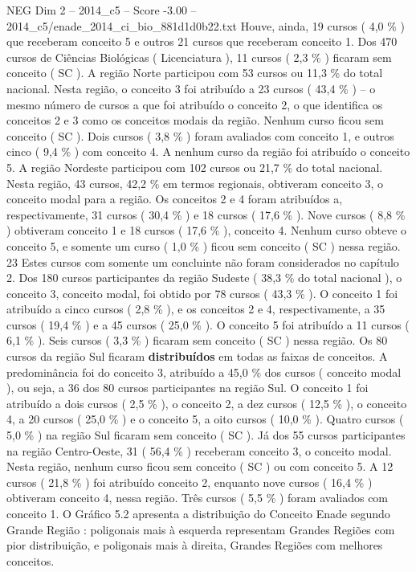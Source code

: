 \begin{textsample}{NEG Dim 2 – 2014\_c5 – Score -3.00 – 2014\_c5/enade\_2014\_ci\_bio\_881d1d0b22.txt}
Houve, ainda, 19 cursos ( 4,0 \% ) que receberam conceito 5 e outros 21 cursos que receberam conceito 1.
Dos 470 cursos de Ciências Biológicas ( Licenciatura ), 11 cursos ( 2,3 \% ) ficaram sem conceito ( SC ).
A região Norte participou com 53 cursos ou 11,3 \% do total nacional.
Nesta região, o conceito 3 foi atribuído a 23 cursos ( 43,4 \% ) – o mesmo número de cursos a que foi atribuído o conceito 2, o que identifica os conceitos 2 e 3 como os conceitos modais da região.
Nenhum curso ficou sem conceito ( SC ).
Dois cursos ( 3,8 \% ) foram avaliados com conceito 1, e outros cinco ( 9,4 \% ) com conceito 4.
A nenhum curso da região foi atribuído o conceito 5.
A região Nordeste participou com 102 cursos ou 21,7 \% do total nacional.
Nesta região, 43 cursos, 42,2 \% em termos regionais, obtiveram conceito 3, o conceito modal para a região.
Os conceitos 2 e 4 foram atribuídos a, respectivamente, 31 cursos ( 30,4 \% ) e 18 cursos ( 17,6 \% ).
Nove cursos ( 8,8 \% ) obtiveram conceito 1 e 18 cursos ( 17,6 \% ), conceito 4.
Nenhum curso obteve o conceito 5, e somente um curso ( 1,0 \% ) ficou sem conceito ( SC ) nessa região. 23 Estes cursos com somente um concluinte não foram considerados no capítulo 2.
Dos 180 cursos participantes da região Sudeste ( 38,3 \% do total nacional ), o conceito 3, conceito modal, foi obtido por 78 cursos ( 43,3 \% ).
O conceito 1 foi atribuído a cinco cursos ( 2,8 \% ), e os conceitos 2 e 4, respectivamente, a 35 cursos ( 19,4 \% ) e a 45 cursos ( 25,0 \% ).
O conceito 5 foi atribuído a 11 cursos ( 6,1 \% ).
Seis cursos ( 3,3 \% ) ficaram sem conceito ( SC ) nessa região.
Os 80 cursos da região Sul ficaram \textbf{distribuídos} em todas as faixas de conceitos.
A predominância foi do conceito 3, atribuído a 45,0 \% dos cursos ( conceito modal ), ou seja, a 36 dos 80 cursos participantes na região Sul.
O conceito 1 foi atribuído a dois cursos ( 2,5 \% ), o conceito 2, a dez cursos ( 12,5 \% ), o conceito 4, a 20 cursos ( 25,0 \% ) e o conceito 5, a oito cursos ( 10,0 \% ).
Quatro cursos ( 5,0 \% ) na região Sul ficaram sem conceito ( SC ).
Já dos 55 cursos participantes na região Centro-Oeste, 31 ( 56,4 \% ) receberam conceito 3, o conceito modal.
Nesta região, nenhum curso ficou sem conceito ( SC ) ou com conceito 5.
A 12 cursos ( 21,8 \% ) foi atribuído conceito 2, enquanto nove cursos ( 16,4 \% ) obtiveram conceito 4, nessa região.
Três cursos ( 5,5 \% ) foram avaliados com conceito 1.
O Gráfico 5.2 apresenta a distribuição do Conceito Enade segundo Grande Região : poligonais mais à esquerda representam Grandes Regiões com pior distribuição, e poligonais mais à direita, Grandes Regiões com melhores conceitos.

\end{textsample}
